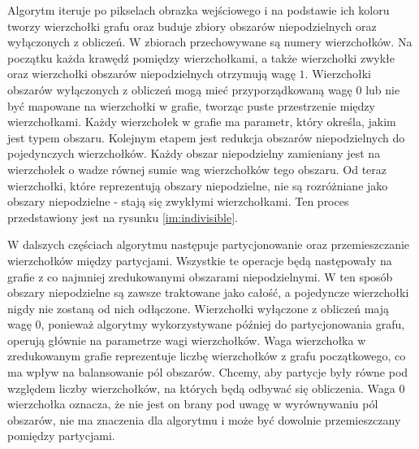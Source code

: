 Algorytm iteruje po pikselach obrazka wejściowego i na podstawie ich koloru tworzy wierzchołki grafu oraz buduje zbiory
obszarów niepodzielnych oraz wyłączonych z obliczeń.
W zbiorach przechowywane są numery wierzchołków.
Na początku każda krawędź pomiędzy wierzchołkami, a także
wierzchołki zwykłe oraz wierzchołki obszarów niepodzielnych otrzymują wagę $1$.
Wierzchołki obszarów wyłączonych z obliczeń mogą mieć przyporządkowaną wagę $0$ lub nie być mapowane na wierzchołki w grafie,
tworząc puste przestrzenie między wierzchołkami.
Każdy wierzchołek w grafie ma parametr, który określa, jakim jest typem obszaru.
Kolejnym etapem jest redukcja obszarów niepodzielnych do pojedynczych wierzchołków.
Każdy obszar niepodzielny zamieniany jest na wierzchołek o wadze równej sumie wag wierzchołków tego obszaru.
Od teraz wierzchołki, które reprezentują obszary niepodzielne, nie są rozróżniane jako obszary niepodzielne -
stają się zwykłymi wierzchołkami.
Ten proces przedstawiony jest na rysunku \ref{im:indivisible}.

W dalszych częściach algorytmu następuje partycjonowanie oraz przemieszczanie wierzchołków między partycjami.
Wszystkie te operacje będą następowały na grafie z co najmniej zredukowanymi obszarami niepodzielnymi.
W ten sposób obszary niepodzielne są zawsze traktowane jako całość, a pojedyncze wierzchołki nigdy nie zostaną od nich odłączone.
Wierzchołki wyłączone z obliczeń mają wagę $0$, ponieważ algorytmy wykorzystywane później do partycjonowania grafu, operują
głównie na parametrze wagi wierzchołków.
Waga wierzchołka w zredukowanym grafie reprezentuje liczbę wierzchołków z grafu początkowego, co ma wpływ
na balansowanie pól obszarów.
Chcemy, aby partycje były równe pod względem liczby wierzchołków, na których będą odbywać się obliczenia.
Waga $0$ wierzchołka oznacza, że nie jest on brany pod uwagę w wyrównywaniu pól obszarów, nie ma znaczenia dla algorytmu i
może być dowolnie przemieszczany pomiędzy partycjami.

\vspace{8mm}


